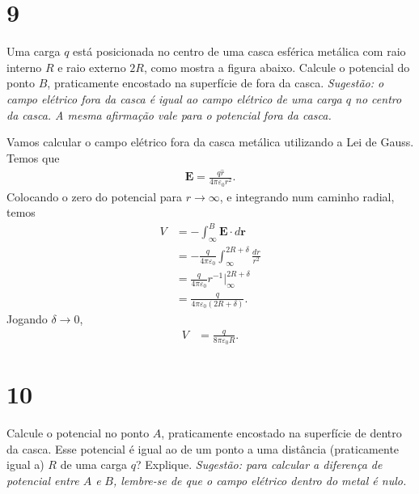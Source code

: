 \documentclass[11pt]{article}
\begin{document}
\section{9}
\label{sec:orgd8e4bd7}
Uma carga \(q\) está posicionada no centro de uma casca esférica metálica
com raio interno \(R\) e raio externo \(2R\), como mostra a figura
abaixo. Calcule o potencial do ponto \(B\), praticamente encostado na
superfície de fora da casca. \emph{Sugestão: o campo elétrico fora da casca é}
\emph{igual ao campo elétrico de uma carga \(q\) no centro da casca. A mesma}
\emph{afirmação vale para o potencial fora da casca.}

\begin{figure}[h!]
  \centering
\end{figure}

Vamos calcular o campo elétrico fora da casca metálica utilizando a Lei
de Gauss. Temos que
\begin{align}
  \mathbf E = \frac {q\hat r}{4\pi\varepsilon_0r^2}.
\end{align}
Colocando o zero do potencial para \(r\rightarrow\infty\), e integrando num caminho
radial, temos
\begin{align}
  V &= -\int_\infty^{B}\mathbf E\cdot d\mathbf r\\
    &= -\frac q{4\pi\varepsilon_0}\int_\infty^{2R+\delta}\frac{dr}{r^2}\\
    &= \frac q{4\pi\varepsilon_0}r^{-1}\Big\vert_\infty^{2R+\delta}\\
    &= \frac q{4\pi\varepsilon_0(2R+\delta)}.
\end{align}
Jogando \(\delta\rightarrow0\),
\begin{align}
   V &= \frac q{8\pi\varepsilon_0R}.
\end{align}

\section{10}
\label{sec:orgf6502ce}
Calcule o potencial no ponto \(A\), praticamente encostado na superfície
de dentro da casca. Esse potencial é igual ao de um ponto a uma
distância (praticamente igual a) \(R\) de uma carga \(q\)?
Explique. \emph{Sugestão: para calcular a diferença de potencial entre \(A\) e}
\emph{\(B\), lembre-se de que o campo elétrico dentro do metal é nulo.}
\end{document}
